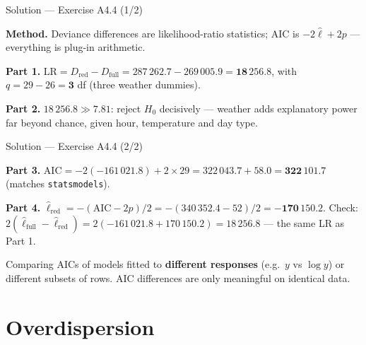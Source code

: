 \documentclass[aspectratio=169,11pt]{beamer}
\begin{document}
\begin{frame}{Solution --- Exercise A4.4 (1/2)}
\begin{solutionbox}
  \textbf{Method.} Deviance differences are likelihood-ratio statistics; AIC is
  $-2\hat\ell + 2p$ --- everything is plug-in arithmetic.

  \textbf{Part 1.} $\text{LR} = D_{\text{red}} - D_{\text{full}}
  = 287\,262.7 - 269\,005.9 = \mathbf{18\,256.8}$, with
  $q = 29 - 26 = \mathbf{3}$ df (three weather dummies).

  \textbf{Part 2.} $18\,256.8 \gg 7.81$: reject $H_0$ decisively --- weather adds
  explanatory power far beyond chance, given hour, temperature and day type.
\end{solutionbox}
\end{frame}

\begin{frame}{Solution --- Exercise A4.4 (2/2)}
\begin{solutionbox}
  \textbf{Part 3.} $\text{AIC} = -2(-161\,021.8) + 2\times 29
  = 322\,043.7 + 58.0 = \mathbf{322\,101.7}$ \checkmark (matches
  \texttt{statsmodels}).

  \textbf{Part 4.} $\hat\ell_{\text{red}} = -(\text{AIC} - 2p)/2
  = -(340\,352.4 - 52)/2 = \mathbf{-170\,150.2}$. Check:
  $2(\hat\ell_{\text{full}} - \hat\ell_{\text{red}})
  = 2(-161\,021.8 + 170\,150.2) = 18\,256.8$ \checkmark --- the same LR as Part 1.
\end{solutionbox}
\begin{mistake}
  Comparing AICs of models fitted to \textbf{different responses} (e.g.\ $y$ vs
  $\log y$) or different subsets of rows. AIC differences are only meaningful on
  identical data.
\end{mistake}
\end{frame}

\section{Overdispersion}
\end{document}

